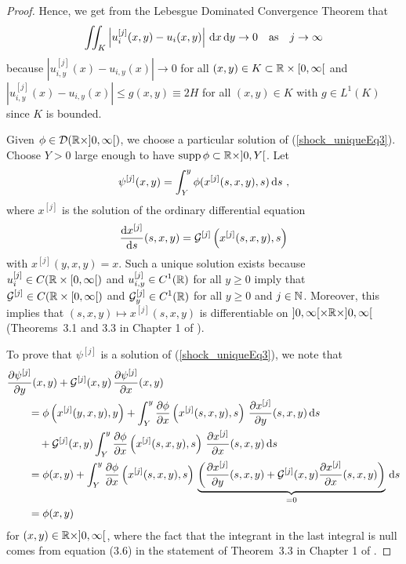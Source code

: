 \begin{proof}
Hence, we get from the Lebesgue Dominated Convergence Theorem that
\begin{align*}
\iint_K \left| u_i^{[j]}(x,y) - u_i(x,y)\right| \,\mathrm{d}{x}\,\mathrm{d}{y}
\to 0 \quad \text{as} \quad  j \to \infty
\end{align*}
because
$\displaystyle \left| u_{i,y}^{[j]}(x) - u_{i,y}(x) \right| \to 0$
for all $(x,y) \in K \subset \mathbb{R}\times [0,\infty[$ and
$\displaystyle \left| u_{i,y}^{[j]}(x) - u_{i,y}(x) \right| \leq 
g(x,y) \equiv 2 H$ for all $(x,y) \in K$ with
$\displaystyle g \in L^1(K)$ since $K$ is bounded.

 Given $\phi \in \mathcal{D}(\mathbb{R}\times ]0,\infty[)$, we choose a
particular solution of (\ref{shock_uniqueEq3}).  Choose
$Y>0$ large enough to have $\operatorname{supp} \phi \subset \mathbb{R}\times ]0,Y[$.
Let
\begin{equation} \label{shock_uniqueEq5}
  \psi^{[j]}(x,y) = \int_Y^y \phi(x^{[j]}(s,x,y),s) \,\mathrm{d}{s} \ ,
\end{equation}
where $\displaystyle x^{[j]}$ is the solution of the ordinary
differential equation
\begin{equation} \label{shock_uniqueEq6}
  \frac{\mathrm{d}x^{[j]}}{\mathrm{d}{s}}(s,x,y) = {\cal G}^{[j]}\left(x^{[j]}(s,x,y),s\right)
\end{equation}
with $x^{[j]}(y,x,y) = x$.   Such a unique solution exists because
$\displaystyle u_i^{[j]} \in C(\mathbb{R} \times [0,\infty[)$
and $\displaystyle u_{i,y}^{[j]} \in C^1(\mathbb{R})$ for all $y \geq 0$
imply that $\displaystyle {\cal G}^{[j]} \in C(\mathbb{R} \times [0,\infty[)$
and $\displaystyle {\cal G}^{[j]}_y \in C^1(\mathbb{R})$ for all $y \geq 0$
and $j \in \mathbb{N}$.  Moreover, this
implies that $\displaystyle (s,x,y) \mapsto x^{[j]}(s,x,y)$
is differentiable on $\displaystyle ]0,\infty[\times \mathbb{R} \times ]0,\infty[$
(Theorems~3.1 and 3.3 in Chapter 1 of \cite{Ha}).

To prove that $\displaystyle \psi^{[j]}$ is a solution of
(\ref{shock_uniqueEq3}), we note that
\begin{align*}
&\frac{\partial{\psi^{[j]}}}{\partial y}(x,y) + {\cal G}^{[j]}(x,y)\,\frac{\partial{\psi^{[j]}}}{\partial x}(x,y) \\
&\qquad = \phi\left(x^{[j]}(y,x,y),y\right)
+ \int_Y^y \frac{\partial{\phi}}{\partial x}\left(x^{[j]}(s,x,y),s\right)\,
\frac{\partial{x^{[j]}}}{\partial y}(s,x,y) \,\mathrm{d}{s} \\
&\qquad \quad + {\cal G}^{[j]}(x,y)
\int_Y^y \frac{\partial{\phi}}{\partial x}\left(x^{[j]}(s,x,y),s\right)\,
\frac{\partial{x^{[j]}}}{\partial x}(s,x,y) \,\mathrm{d}{s} \\
&\qquad = \phi(x,y) + \int_Y^y \frac{\partial{\phi}}{\partial x}\left(x^{[j]}(s,x,y),s\right)\,
\underbrace{\left( \frac{\partial{x^{[j]}}}{\partial y}(s,x,y) + {\cal G}^{[j]}(x,y)
\frac{\partial{x^{[j]}}}{\partial x}(s,x,y) \right)}_{=0} \,\mathrm{d}{s} \\
&\qquad = \phi(x,y)
\end{align*}
for $(x,y) \in \mathbb{R}\times ]0,\infty[$, where the fact that the
integrant in the last integral is null comes from equation (3.6) in
the statement of Theorem~3.3 in Chapter 1 of \cite{Ha}.


\end{proof}
